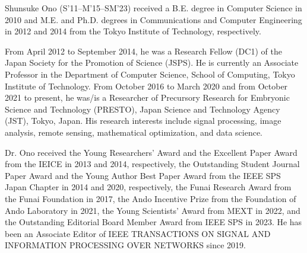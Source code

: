 \documentclass[10pt,journal]{IEEEtran}
\begin{document}
\begin{IEEEbiography}{Shunsuke Ono}
(S’11–M’15–SM'23) received a B.E. degree in Computer Science in 2010 and M.E. and Ph.D. degrees in Communications and Computer Engineering in 2012 and 2014 from the Tokyo Institute of Technology, respectively.

From April 2012 to September 2014, he was a Research Fellow (DC1) of the Japan Society for the Promotion of Science (JSPS). He is currently an Associate Professor in the Department of Computer Science, School of Computing, Tokyo Institute of Technology. From October 2016 to March 2020 and from October 2021 to present, he was/is a Researcher of Precursory Research for Embryonic Science and Technology (PRESTO), Japan Science and Technology Agency (JST), Tokyo, Japan. His research interests include signal processing, image analysis, remote sensing, mathematical optimization, and data science.

Dr. Ono received the Young Researchers’ Award and the Excellent Paper Award from the IEICE in 2013 and 2014, respectively, the Outstanding Student Journal Paper Award and the Young Author Best Paper Award from the IEEE SPS Japan Chapter in 2014 and 2020, respectively, the Funai Research Award from the Funai Foundation in 2017, the Ando Incentive Prize from the Foundation of Ando Laboratory in 2021, the Young Scientists’ Award from MEXT in 2022, and the Outstanding Editorial Board Member Award from IEEE SPS in 2023. He has been an Associate Editor of IEEE TRANSACTIONS ON SIGNAL AND INFORMATION PROCESSING OVER NETWORKS since 2019.
\end{IEEEbiography}




\vfill
\end{document}

